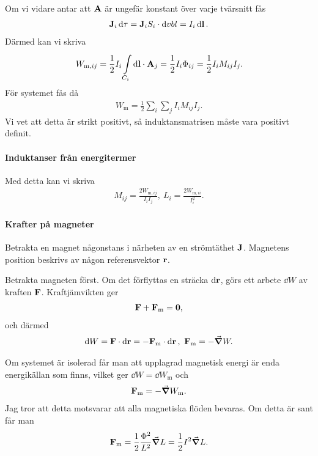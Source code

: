 Om vi vidare antar att $\vb{A}$ är ungefär konstant över varje tvärsnitt fås
\begin{align*}
	\vb{J}_{i}\dd{\tau} = \vb{J}_{i}S_{i}\cdot\dd{vb{l}} = I_{i}\dd{\vb{l}}.
\end{align*}
Därmed kan vi skriva
\begin{align*}
	W_{\text{m}, ij} = \frac{1}{2}I_{i}\int\limits_{C_{i}}^{}\dd{\vb{l}}\cdot \vb{A}_{j} = \frac{1}{2}I_{i}\Phi_{ij} = \frac{1}{2}I_{i}M_{ij}I_{j}.
\end{align*}
För systemet fås då
\begin{align*}
	W_{\text{m}} = \frac{1}{2}\sum\limits_{i}\sum\limits_{j}I_{i}M_{ij}I_{j}.
\end{align*}
Vi vet att detta är strikt positivt, så induktansmatrisen måste vara positivt definit.

\paragraph{Induktanser från energitermer}
Med detta kan vi skriva
\begin{align*}
	M_{ij} = \frac{2W_{\text{m}, ij}}{I_{i}I_{j}},\ L_{i} = \frac{2W_{\text{m}, ii}}{I_{i}^{2}}.
\end{align*}

\paragraph{Krafter på magneter}
Betrakta en magnet någonstans i närheten av en strömtäthet $\vb{J}$. Magnetens position beskrivs av någon referensvektor $\vb{r}$.

Betrakta magneten först. Om det förflyttas en sträcka $\dd{\vb{r}}$, görs ett arbete $\dd{W}$ av kraften $\vb{F}$. Kraftjämvikten ger
\begin{align*}
	\vb{F} + \vb{F}_{\text{m}} = \vb{0},
\end{align*}
och därmed
\begin{align*}
	\dd{W} = \vb{F}\cdot\dd{\vb{r}} = -\vb{F}_{\text{m}}\cdot\dd{\vb{r}},\ \vb{F}_{\text{m}} = -\grad{W}.
\end{align*}

Om systemet är isolerad får man att upplagrad magnetisk energi är enda energikällan som finns, vilket ger $\dd{W} = \dd{W}_{\text{m}}$ och
\begin{align*}
	\vb{F}_{\text{m}} = -\grad{W_{\text{m}}}.
\end{align*}
Jag tror att detta motsvarar att alla magnetiska flöden bevaras. Om detta är sant får man
\begin{align*}
	\vb{F}_{\text{m}} = \frac{1}{2}\frac{\Phi^{2}}{L^{2}}\grad{L} = \frac{1}{2}I^{2}\grad{L}.
\end{align*}

